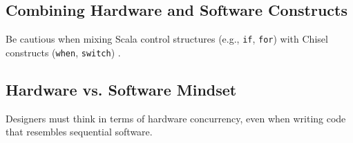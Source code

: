 \subsection{Combining Hardware and Software Constructs}
Be cautious when mixing Scala control structures (e.g., \texttt{if}, \texttt{for}) with Chisel constructs (\texttt{when}, \texttt{switch}) \cite{chisel-tutorial}.

\subsection{Hardware vs. Software Mindset}
Designers must think in terms of hardware concurrency, even when writing code that resembles sequential software.

